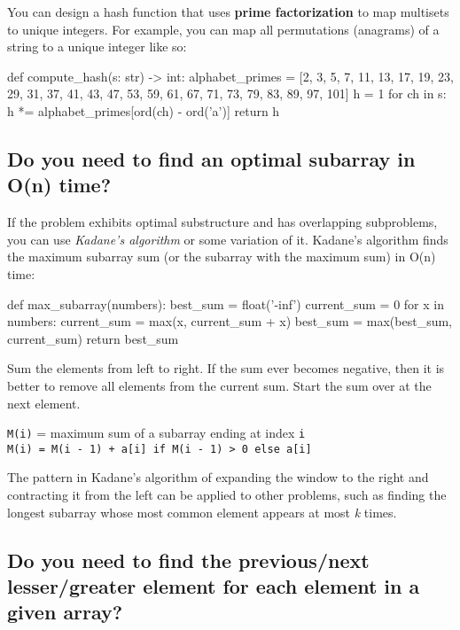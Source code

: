 \documentclass[12pt, titlepage]{article}
\begin{document}
You can design a hash function that uses \textbf{prime factorization} to map multisets to unique integers. For example, you can map all permutations (anagrams) of a string to a unique integer like so: \medskip

\begin{python}
def compute_hash(s: str) -> int:
    alphabet_primes = [2, 3, 5, 7, 11, 13, 17, 19, 23, 29,
                       31, 37, 41, 43, 47, 53, 59, 61, 67,
                       71, 73, 79, 83, 89, 97, 101]
    h = 1
    for ch in s:
        h *= alphabet_primes[ord(ch) - ord('a')]
    return h
\end{python} \bigskip

\subsection{Do you need to find an optimal subarray in O(n) time?}

If the problem exhibits optimal substructure and has overlapping subproblems, you can use \textit{Kadane's algorithm} or some variation of it. Kadane's algorithm finds the maximum subarray sum (or the subarray with the maximum sum) in O(n) time: \medskip

\begin{python}
def max_subarray(numbers):
    best_sum = float('-inf')
    current_sum = 0
    for x in numbers:
        current_sum = max(x, current_sum + x)
        best_sum = max(best_sum, current_sum)
    return best_sum
\end{python}

Sum the elements from left to right. If the sum ever becomes negative,
then it is better to remove all elements from the current sum. Start the sum over at the next element.

\begin{center}
\texttt{M(i)} = maximum sum of a subarray ending at index \texttt{i} \\
\texttt{M(i) = M(i - 1) + a[i] if M(i - 1) > 0 else a[i]}
\end{center}

The pattern in Kadane's algorithm of expanding the window to the right and contracting it from the left can be applied to other problems, such as finding the longest subarray whose most common element appears at most \textit{k} times.

\subsection{Do you need to find the previous/next lesser/greater element for each element in a given array?}
\end{document}
